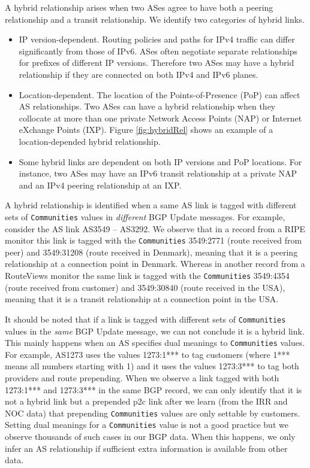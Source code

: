 \documentclass[conference]{IEEEtran}
\begin{document}
A hybrid relationship arises when two ASes agree to have both a peering relationship and a transit relationship.
We identify two categories of hybrid links.
 \begin{itemize}
	\item IP version-dependent. Routing policies and paths for IPv4 traffic can differ significantly from those of IPv6. ASes often negotiate separate relationships for prefixes of different IP versions. Therefore two ASes may have a hybrid relationship if they are connected on both  IPv4 and  IPv6 planes.	
	\item Location-dependent. The location of the Points-of-Presence (PoP) can affect AS relationships. Two ASes can have a hybrid relationship when they collocate at more than one  private Network Access Points (NAP) or Internet eXchange Points (IXP).  Figure \ref{fig:hybridRel} shows an example of a location-depended hybrid relationship. 
	\item Some hybrid links are dependent on both IP versions and PoP locations. For instance, two ASes may have an IPv6 transit relationship at a private NAP and an IPv4 peering relationship at an IXP. 
\end{itemize}

A hybrid relationship is identified when a same AS link is tagged with {different} sets  of  {\tt Communities} values in \textit{different} BGP Update messages.
For example, consider the AS link AS3549 -- AS3292. We observe that in a record from a RIPE monitor this link is tagged with the {\tt Communities} 3549:2771 (route received from peer) and 3549:31208 (route received in Denmark), meaning that it is a peering relationship at a connection point in Denmark. Whereas in another record from a RouteViews monitor the same link is tagged with the {\tt Communities} 3549:4354 (route received from customer) and 3549:30840 (route received in the USA), meaning that it is a transit relationship  at a connection point in the USA.

It should be noted that if a link is tagged with different sets of {\tt Communities} values in the {\it same} BGP Update message, we can not conclude  it is a hybrid link. This mainly happens when an AS specifies dual meanings to {\tt Communities} values.
For example, AS1273 uses the  values 1273:1***  to tag customers (where 1*** means all numbers starting with 1) and it uses the values 1273:3*** to tag both providers and route prepending. 
When we observe a link tagged with both   1273:1***  and 1273:3*** in the same BGP record, we can only identify that it  is not a hybrid link but a prepended p2c link  after we learn (from the IRR and NOC data) that prepending {\tt Communities} values are only settable by customers.
Setting dual meanings for a {\tt Communities} value is not a good practice but we observe thousands of such cases in our BGP data. When this happens, we only infer an AS relationship if sufficient extra information is available from other data. 
\end{document}

